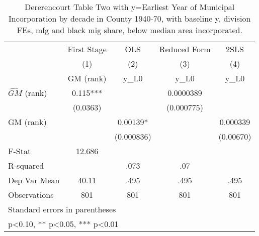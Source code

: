 \begin{table}[htbp]\centering
\def\sym#1{\ifmmode^{#1}\else\(^{#1}\)\fi}
\caption{Dererencourt Table Two with y=Earliest Year of Municipal Incorporation by decade in County 1940-70, with baseline y, division FEs, mfg and black mig share, below median area incorporated.}
\begin{tabular}{l*{4}{c}}
\toprule
                    & First Stage   &         OLS   &Reduced Form   &        2SLS   \\
                    &\multicolumn{1}{c}{(1)}&\multicolumn{1}{c}{(2)}&\multicolumn{1}{c}{(3)}&\multicolumn{1}{c}{(4)}\\
                    &\multicolumn{1}{c}{GM  (rank)}&\multicolumn{1}{c}{y\_L0}&\multicolumn{1}{c}{y\_L0}&\multicolumn{1}{c}{y\_L0}\\
\midrule
$\hat{GM}$ (rank)   &       0.115***&               &   0.0000389   &               \\
                    &    (0.0363)   &               &  (0.000775)   &               \\
\addlinespace
GM  (rank)          &               &     0.00139*  &               &    0.000339   \\
                    &               &  (0.000836)   &               &   (0.00670)   \\
\midrule
F-Stat              &      12.686   &               &               &               \\
R-squared           &               &        .073   &         .07   &               \\
Dep Var Mean        &       40.11   &        .495   &        .495   &        .495   \\
Observations        &         801   &         801   &         801   &         801   \\
\bottomrule
\multicolumn{5}{l}{\footnotesize Standard errors in parentheses}\\
\multicolumn{5}{l}{\footnotesize * p<0.10, ** p<0.05, *** p<0.01}\\
\end{tabular}
\end{table}
